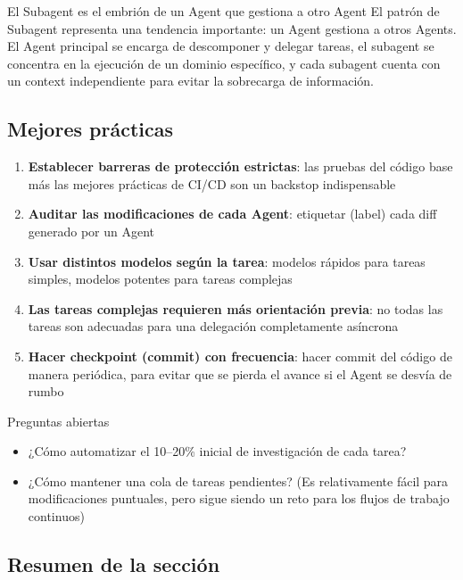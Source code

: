 \documentclass[a4paper]{article}
\begin{document}
\begin{importantbox}{El Subagent es el embrión de un Agent que gestiona a otro Agent}
El patrón de Subagent representa una tendencia importante: un Agent gestiona a otros Agents. El Agent principal se encarga de descomponer y delegar tareas, el subagent se concentra en la ejecución de un dominio específico, y cada subagent cuenta con un context independiente para evitar la sobrecarga de información.
\end{importantbox}

\subsection{Mejores prácticas}

\begin{enumerate}
    \item \textbf{Establecer barreras de protección estrictas}: las pruebas del código base más las mejores prácticas de CI/CD son un backstop indispensable
    \item \textbf{Auditar las modificaciones de cada Agent}: etiquetar (label) cada diff generado por un Agent
    \item \textbf{Usar distintos modelos según la tarea}: modelos rápidos para tareas simples, modelos potentes para tareas complejas
    \item \textbf{Las tareas complejas requieren más orientación previa}: no todas las tareas son adecuadas para una delegación completamente asíncrona
    \item \textbf{Hacer checkpoint (commit) con frecuencia}: hacer commit del código de manera periódica, para evitar que se pierda el avance si el Agent se desvía de rumbo
\end{enumerate}

\begin{warningbox}{Preguntas abiertas}
\begin{itemize}
    \item ¿Cómo automatizar el 10--20\% inicial de investigación de cada tarea?
    \item ¿Cómo mantener una cola de tareas pendientes? (Es relativamente fácil para modificaciones puntuales, pero sigue siendo un reto para los flujos de trabajo continuos)
\end{itemize}
\end{warningbox}

\subsection{Resumen de la sección}
\end{document}
